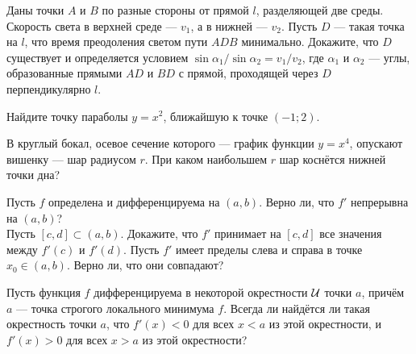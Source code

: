\documentclass[a4paper, 12pt]{article}
\begin{document}
Даны точки $A$ и $B$ по разные стороны от прямой $l$, разделяющей
две среды. Скорость света в верхней среде --- $v_1$, а в нижней --- $v_2$.
Пусть $D$ --- такая точка на $l$, что время преодоления светом пути $ADB$ минимально.
Докажите, что $D$ существует и определяется условием
$\sin\alpha_1/\sin\alpha_2=v_1/v_2$, где $\alpha_1$ и $\alpha_2$ ---
углы, образованные прямыми $AD$ и $BD$ с прямой, проходящей через $D$ перпендикулярно $l$.

Найдите точку параболы $y=x^2$, ближайшую к точке $(-1;2)$.


 В круглый бокал, осевое сечение которого --- график
функции $y=x^4$, опускают вишенку --- шар радиусом $r$.
При каком наибольшем $r$ шар косн\"ется нижней точки дна?




 Пусть %
$f$ определена и дифференцируема
на $(a,b)$.
 Верно ли, что $f'$ непрерывна на $(a,b)$?\\
Пусть $[c,d]\subset(a,b)$.
Докажите, что $f'$  принимает на $[c,d]$ все значения между
$f'(c)$ и $f'(d)$.
 Пусть $f'$ имеет пределы слева и справа в точке $x_0\in(a,b)$.
Верно ли, что %
они совпадают?
%

Пусть функция $f$ дифференцируема в некоторой окрестности $\cal U$
точки $a$, прич\"ем
%
$a$ --- точка строгого локального минимума $f$. Всегда ли
найд\"ется ли такая окрестность точки $a$, что $f'(x)<0$ для всех $x<a$
из этой окрестности, и $f'(x)>0$ для всех $x>a$ из этой окрестности?




\end{document}
